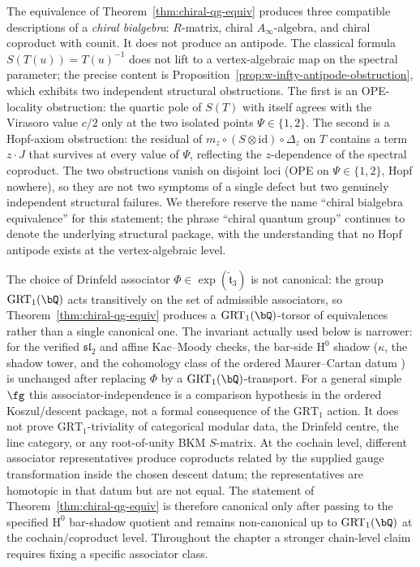 \begin{remark}
\label{rem:chiral-bialgebra-not-hopf}
The equivalence of
Theorem~\textup{\ref{thm:chiral-qg-equiv}} produces three compatible
descriptions of a \emph{chiral bialgebra}: $R$-matrix, chiral
$A_\infty$-algebra, and chiral coproduct with counit. It does not
produce an antipode. The classical formula $S(T(u)) = T(u)^{-1}$
does not lift to a vertex-algebraic map on the spectral parameter;
the precise content is
Proposition~\textup{\ref{prop:w-infty-antipode-obstruction}}, which
exhibits two independent structural obstructions. The first is an
OPE-locality obstruction: the quartic pole of $S(T)$ with itself
agrees with the Virasoro value $c/2$ only at the two isolated points
$\Psi \in \{1, 2\}$. The second is a Hopf-axiom obstruction: the
residual of $m_z \circ (S \otimes \mathrm{id}) \circ \Delta_z$ on $T$
contains a term $z \cdot J$ that survives at every value of $\Psi$,
reflecting the $z$-dependence of the spectral coproduct. The two
obstructions vanish on disjoint loci (OPE on $\Psi \in \{1,2\}$, Hopf
nowhere), so they are not two symptoms of a single defect but two
genuinely independent structural failures. We therefore reserve the
name ``chiral bialgebra equivalence'' for this statement; the phrase
``chiral quantum group'' continues to denote the underlying
structural package, with the understanding that no Hopf antipode
exists at the vertex-algebraic level.
\end{remark}

\begin{remark}
\label{rem:chiral-qg-grt1-torsor}
The choice of Drinfeld associator
$\Phi \in \exp(\hat{\mathfrak{t}}_3)$ is not canonical: the group
$\mathrm{GRT}_1(\bQ)$ acts transitively on the set of admissible
associators, so
Theorem~\textup{\ref{thm:chiral-qg-equiv}} produces a
$\mathrm{GRT}_1(\bQ)$-torsor of equivalences rather than a single
canonical one. The invariant actually used below is narrower: for the
verified $\mathfrak{sl}_2$ and affine Kac--Moody checks, the
bar-side $\mathrm{H}^0$ shadow \textup{(}$\kappa$, the shadow tower,
and the cohomology class of the ordered Maurer--Cartan datum
\textup{)} is unchanged after replacing $\Phi$ by a
$\mathrm{GRT}_1(\bQ)$-transport. For a general simple $\fg$ this
associator-independence is a comparison hypothesis in the ordered
Koszul/descent package, not a formal consequence of the
$\mathrm{GRT}_1$ action. It does not prove
$\mathrm{GRT}_1$-triviality of categorical modular data, the
Drinfeld centre, the line category, or any root-of-unity BKM
$S$-matrix. At the cochain level, different associator
representatives produce coproducts related by the supplied gauge
transformation inside the chosen descent datum; the representatives
are homotopic in that datum but are not equal. The statement of
Theorem~\textup{\ref{thm:chiral-qg-equiv}} is therefore canonical
only after passing to the specified $\mathrm{H}^0$ bar-shadow quotient
and remains non-canonical up to $\mathrm{GRT}_1(\bQ)$ at the
cochain/coproduct level. Throughout the chapter a stronger
chain-level claim requires fixing a specific associator class.
\end{remark}

